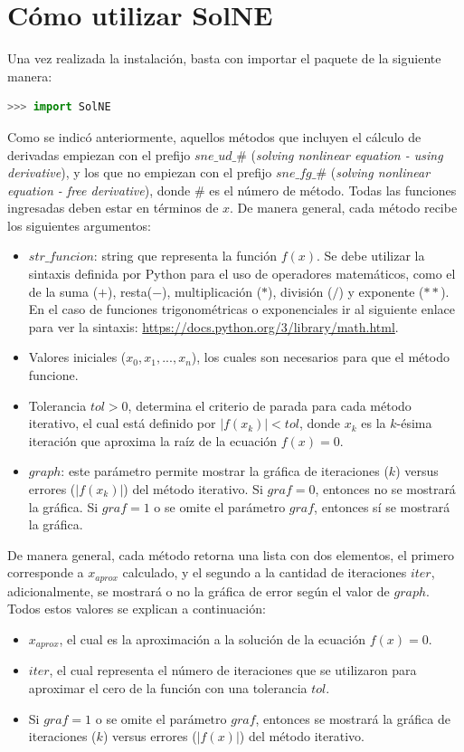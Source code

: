 \documentclass[12pt]{article}
\begin{document}
\section{Cómo utilizar SolNE}\label{uso}
Una vez realizada la instalación, basta con importar el paquete de la siguiente manera:
\begin{lstlisting}[language=python]
  >>> import SolNE
\end{lstlisting}
Como se indicó anteriormente, aquellos métodos que incluyen el cálculo de derivadas empiezan con el prefijo $sne\_ud\_\#$ (\textit{solving nonlinear equation - using derivative}), y los que no empiezan con el prefijo $sne\_fg\_\#$ (\textit{solving nonlinear equation - free derivative}), donde $\#$ es el número de método. Todas las funciones ingresadas deben estar en términos de $x$.\newline
De manera general, cada método recibe los siguientes argumentos:
\begin{itemize}
	\item $str\_funcion$: string que representa la función $f(x)$. Se debe utilizar la sintaxis definida por Python para el uso de operadores matemáticos, como el de la suma ($+$), resta($-$), multiplicación ($*$), división ($/$) y exponente ($**$). En el caso de funciones trigonométricas o exponenciales ir al siguiente enlace para ver la sintaxis: \url{https://docs.python.org/3/library/math.html}.
	\item Valores iniciales ($x_{0}, x_{1}, ..., x_{n}$), los cuales son necesarios para que el método funcione.
	\item Tolerancia $tol > 0$, determina el criterio de parada para cada método iterativo, el cual está definido por $|f(x_{k})| < tol$, donde $x_{k}$ es la $k$-ésima iteración que aproxima la raíz de la ecuación $f(x) = 0$.
	\item $graph$: este parámetro permite mostrar la gráfica de iteraciones ($k$) versus errores ($|f(x_{k})|$) del método iterativo. Si $graf = 0$, entonces no se mostrará la gráfica. Si $graf = 1$ o se omite el parámetro $graf$, entonces sí se mostrará la gráfica.
\end{itemize}
De manera general, cada método retorna una lista con dos elementos, el primero corresponde a $x_{aprox}$ calculado, y el segundo a la cantidad de iteraciones $iter$, adicionalmente, se mostrará o no la gráfica de error según el valor de $graph$. Todos estos valores se explican a continuación:
\begin{itemize}
	\item $x_{aprox}$, el cual es la aproximación a la solución de la ecuación $f(x) = 0$.
	\item $iter$, el cual representa el número de iteraciones que se utilizaron para aproximar el cero de la función con una tolerancia $tol$.
	\item Si $graf = 1$ o se omite el parámetro $graf$, entonces se mostrará la gráfica de iteraciones ($k$) versus errores ($|f(x)|$) del método iterativo.
\end{itemize}
\end{document}
